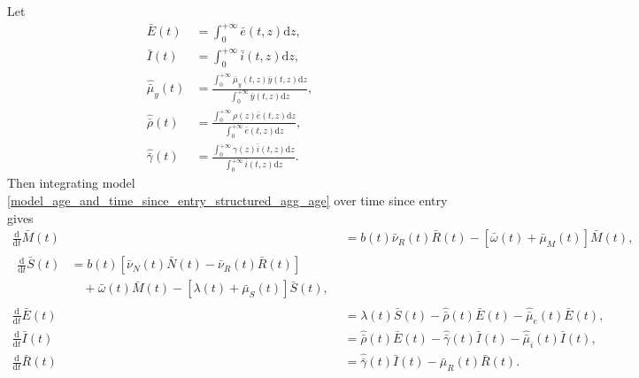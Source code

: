 \documentclass[USenglish]{article}
\newcommand{\md}{\mathrm{d}}
\begin{document}
Let
\begin{subequations}
  \begin{align}
    \bar{E}(t)
    &= \int_0^{+\infty} \bar{e}(t, z) \md z,
    \\
    \bar{I}(t)
    &= \int_0^{+\infty} \bar{i}(t, z) \md z,
    \\
    \hat{\bar{\mu}}_y(t)
    &= \frac{\int_0^{+\infty} \bar{\mu}_y(t, z) \bar{y}(t, z) \md z}
    {\int_0^{+\infty} \bar{y}(t, z) \md z},
    \\
    \hat{\bar{\rho}}(t)
    &= \frac{\int_0^{+\infty} \rho(z) \bar{e}(t, z) \md z}
    {\int_0^{+\infty} \bar{e}(t, z) \md z},
    \\
    \hat{\bar{\gamma}}(t)
    &= \frac{\int_0^{+\infty} \gamma(z) \bar{i}(t, z) \md z}
    {\int_0^{+\infty} \bar{i}(t, z) \md z}.
  \end{align}
\end{subequations}
Then integrating model
\eqref{model_age_and_time_since_entry_structured_agg_age} over time
since entry gives
\begin{subequations}
  \label{model_age_and_time_since_entry_structured_agg_age_tse}
  \begin{align}
    \frac{\md}{\md t} \bar{M}(t)
    &= b(t) \bar{\nu}_R(t) \bar{R}(t)
    - \left[\bar{\omega}(t) + \bar{\mu}_M(t)\right] \bar{M}(t),
    \\
    \begin{split}
      \frac{\md}{\md t} \bar{S}(t)
      &= b(t) \left[
        \bar{\nu}_N(t) \bar{N}(t)
        - \bar{\nu}_R(t) \bar{R}(t)
        \right]
      \\ & \quad {}
      + \bar{\omega}(t) \bar{M}(t)
      - \left[\lambda(t) + \bar{\mu}_S(t)\right] \bar{S}(t),
    \end{split}
    \\
    \frac{\md}{\md t} \bar{E}(t)
    &= \lambda(t) \bar{S}(t)
    - \hat{\bar{\rho}}(t) \bar{E}(t)
    - \hat{\bar{\mu}}_e(t) \bar{E}(t),
    \\
    \frac{\md}{\md t} \bar{I}(t)
    &= \hat{\bar{\rho}}(t) \bar{E}(t)
    - \hat{\bar{\gamma}}(t) \bar{I}(t)
    - \hat{\bar{\mu}}_i(t) \bar{I}(t),
    \\
    \frac{\md}{\md t} \bar{R}(t)
    &= \hat{\bar{\gamma}}(t) \bar{I}(t)
    - \bar{\mu}_R(t) \bar{R}(t).
  \end{align}
\end{subequations}
\end{document}
